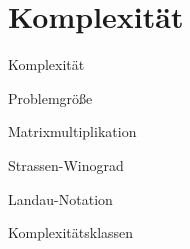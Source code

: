 \section{Komplexität}

\begin{defi}{Komplexität}

\end{defi}

\begin{defi}{Problemgröße}

\end{defi}

\begin{example}[Komplexität]{Matrixmultiplikation}

\end{example}

\begin{example}[Komplexität]{Strassen-Winograd}

\end{example}

\begin{defi}{Landau-Notation}

\end{defi}

\begin{example}{Komplexitätsklassen}

\end{example}



